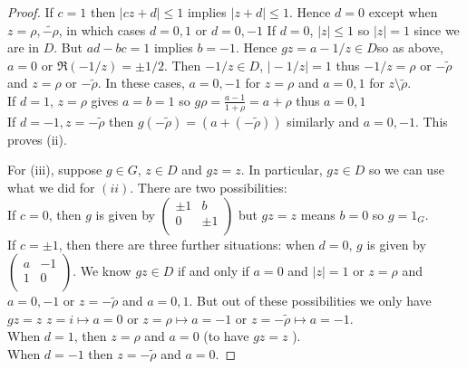 \documentclass[12pt]{article}
\theoremstyle{definition}
\begin{document}
\begin{proof}
        If \(c=1\) then \(\vert cz+d \vert \leq 1\) implies \(\vert z+d \vert \leq 1\). Hence \(d=0\) except when \(z=\rho,\widetilde{-\rho } \), in which cases \(d=0,1\) or \(d=0,-1\)
        If \(d=0\), \(\vert z \vert \leq 1\) so \(\vert z \vert =1\) since we are in \(D\). But \(ad-bc=1\) implies \(b=-1\). Hence \(gz=a-1/z \in D\)so as above, \(a=0\) or \(\Re(-1/z)=\pm 1/2\). Then \(-1/z\in D\), \(\vert -1/z \vert =1\) thus \(-1/z=\rho \) or \(-\widetilde{\rho } \) and \(z=\rho \) or \(-\widetilde{\rho } \). In these cases, \(a=0,-1\) for \(z=\rho \) and \(a=0,1\) for \(z\setminus \widetilde{\rho } \).\\[6pt]
        If \(d=1\), \(z=\rho \) gives \(a=b=1\) so \(g \rho =\frac{a-1}{1+\rho } = a+\rho \) thus \(a=0,1\)\\[6pt]
        If \(d=-1, z=-\widetilde{\rho } \) then \( g (-\widetilde{\rho } ) = (a+(-\widetilde{\rho } ) )  \) similarly and \(a=0,-1\).
        This proves (ii). \qedhere
        
        For (iii), suppose \(g\in G\), \(z\in D\) and \(gz=z\). In particular, \(gz\in D\) so we can use what we did for \((ii)\). There are two possibilities:\\[6pt]
        If \(c=0\), then \(g\) is given by \(\begin{pmatrix}
            \pm 1 &  b   \\
             0 & \pm 1  \\
        \end{pmatrix} \) but \(gz=z\) means \(b=0\) so \(g=1_G\).\\[6pt]
        
        If \(c= \pm 1\), then there are three further situations: when \(d=0\), \(g\) is given by \(\begin{pmatrix}
            a &  -1 \\
            1 &  0 \\
        \end{pmatrix}\). We know \(gz\in D\) if and only if \(a=0\) and \(\vert z \vert =1\) or \(z=\rho \) and \(a=0,-1\) or \(z=-\widetilde{\rho } \) and \(a=0,1\). But out of these possibilities we only have \(gz=z\)  \(z=i \mapsto a=0\) or \(z=\rho \mapsto a=-1\) or \(z=-\widetilde{\rho }\mapsto a=-1 \). \\[6pt]
        When \(d=1\), then \(z=\rho \) and \(a=0\) (to have \(gz=z\) ).\\[6pt]
        When \(d=-1\) then \(z=-\widetilde{\rho } \) and \(a=0\).                    
    \end{proof}
    
\end{document}
